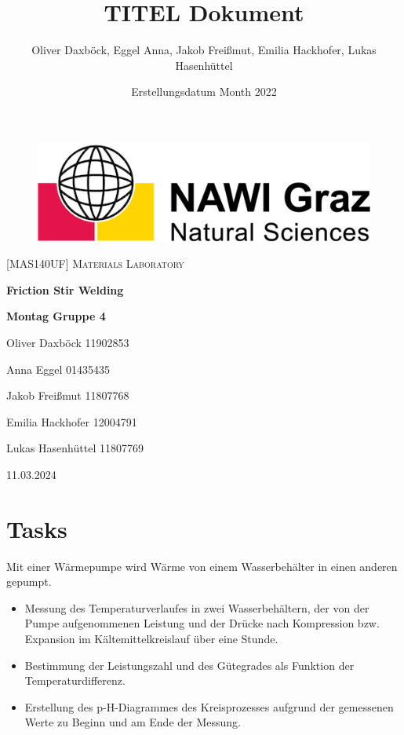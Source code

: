 \documentclass{article}
\title{TITEL Dokument}
\author{Oliver Daxböck, Eggel Anna, Jakob Frei\ss mut, Emilia Hackhofer, Lukas Hasenh\"uttel}
\date{Erstellungsdatum Month 2022}
\begin{document}
\begin{figure}[!t]
\centering
\includegraphics[scale=0.37]{NAWI_Graz_Logo_2015small.png}
\end{figure}



{\text{}
\begin{center}
    {\Large
    \textsc{[MAS140UF] Materials Laboratory} \par}
    \Huge
    \vspace{20mm}
    \textbf{Friction Stir Welding} \par
\end{center}
}

{\Large 
\vspace{5mm}
\vspace{20mm}
\textbf{Montag Gruppe 4} \par
\vspace{8pt}
Oliver Daxb\"ock \hfill 11902853 \par
\vspace{8pt}
Anna Eggel \hfill 01435435 \par
\vspace{8pt}
Jakob Frei\ss mut \hfill 11807768 \par
\vspace{8pt}
Emilia Hackhofer \hfill 12004791 \par
\vspace{8pt}
Lukas Hasenh\"uttel \hfill 11807769 \par
\vspace{8pt}
}

{\large
\vspace{15mm}
11.03.2024
}

\thispagestyle{empty}
\newpage

\tableofcontents
\setcounter{page}{1}

\newpage
\section{Tasks}
Mit einer Wärmepumpe wird Wärme von einem Wasserbehälter in einen anderen gepumpt.
\begin{itemize}
    \item Messung des Temperaturverlaufes in zwei Wasserbehältern, der von der Pumpe aufgenommenen Leistung und der Drücke nach Kompression bzw. Expansion im Kältemittelkreislauf über eine Stunde.
    \item Bestimmung der Leistungszahl und des Gütegrades als Funktion der Temperaturdifferenz.
    \item Erstellung des p-H-Diagrammes des Kreisprozesses aufgrund der gemessenen Werte zu Beginn und am Ende der Messung.
\end{itemize}
\end{document}
